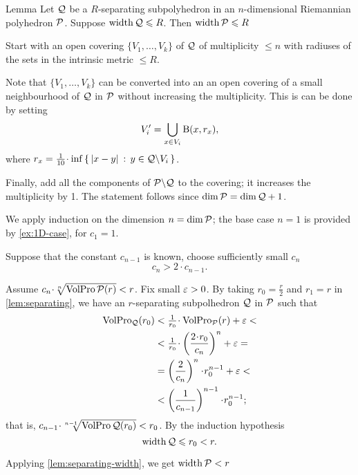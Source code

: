 \begin{thm}{Lemma}\label{lem:separating-width}
Let $\mathcal{Q}$ be a $R$-separating subpolyhedron in an $n$-dimensional Riemannian polyhedron $\mathcal{P}$.
Suppose $\operatorname{\rm width}\nolimits\mathcal{Q}\leqslant R$.
Then $\operatorname{\rm width}\nolimits\mathcal{P}\leqslant R$
\end{thm}

Start with an open covering $\{V_1,\dots,V_k\}$ of $\mathcal{Q}$ of multiplicity $\le n$ with radiuses of the sets in the intrinsic metric $\le R$.

Note that $\{V_1,\dots,V_k\}$ can be converted into an an open covering of
a small neighbourhood of $\mathcal{Q}$ in $\mathcal{P}$ without increasing the multiplicity.
This is can be done by setting 
\[V_i'=\bigcup_{x\in V_i}\mathrm{B}{}(x,r_x),\]
where $r_x=\tfrac1{10}\cdot\inf\set{\dist{x}{y}{}}{y\in \spc{Q}\backslash V_i}$.

Finally, add all the components of $\mathcal{P}\backslash \mathcal{Q}$ to the covering;
it increases the multiplicity by 1.
The statement follows since $\dim \spc{P}= \dim \spc{Q}\z+1$.
\qeds

We apply induction on the dimension $n=\operatorname{\rm dim}\nolimits\mathcal{P}$;
the base case $n=1$ is provided by \ref{ex:1D-case},  for $c_1=1$.

Suppose that the constant $c_{n-1}$ is known, choose sufficiently small $c_n$
\[c_n>2\cdot c_{n-1}.\]

Assume $c_n\cdot \sqrt[n]{\VolPro\spc{P}(r)}< r$.
Fix small $\varepsilon>0$.
By taking $r_0=\tfrac r2$ and $r_1=r$ in \ref{lem:separating}, we have an $r$-separating subpolhedron $\mathcal{Q}$ in $\mathcal{P}$ such that 
\begin{align*}
\VolPro_\spc{Q}(r_0) &< \tfrac 1 {r_0}\cdot \VolPro_\spc{P}(r)+\eps<
\\
&<\tfrac 1 {r_0}\cdot \left(\frac{2\cdot r_0}{c_n}\right)^n+\eps=
\\
&=\left(\frac2{c_n}\right)^n\cdot r_0^{n-1}+\eps<
\\
&<\left(\frac1{c_{n-1}}\right)^{n-1}\cdot r_0^{n-1};
\end{align*}
that is, $c_{n-1}\cdot \sqrt[n-1]{\VolPro\spc{Q}(r_0)}< r_0$.
By the induction hypothesis 
\[\operatorname{\rm width}\nolimits\mathcal{Q}\leqslant r_0<r.\]

Applying \ref{lem:separating-width}, we get $\operatorname{\rm width}\nolimits\mathcal{P}<r$
\qeds

